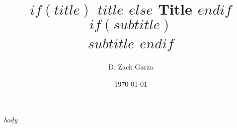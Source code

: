 

\title{
\textbf{
  $if(title)$
  $title$
  $else$
  Title
  $endif$
}
  $if(subtitle)$
  \\ {\normalsize $subtitle$}
  $endif$
}
\author{D. Zack Garza}
\date{\today}



\maketitle
\tableofcontents


$body$





